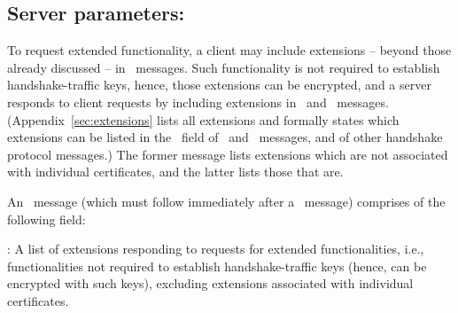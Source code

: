 \subsection{Server parameters: \EncryptedExtensions}\label{sec:EE}


To request extended functionality, a client may include extensions -- beyond those 
already discussed -- in \ClientHello\ messages. Such functionality 
is not required to establish handshake-traffic keys, hence, those extensions 
can be encrypted, and a server responds to client requests by including extensions 
in \EncryptedExtensions\ and \Certificate\ messages.
(Appendix~\ref{sec:extensions} lists all extensions and formally states which extensions 
can be listed in the \TLSextensions\ field of \EncryptedExtensions\ and \Certificate\ 
messages, and of other handshake protocol messages.) The former message lists extensions 
which are not associated with individual certificates, and the latter lists those that are. 

An \EncryptedExtensions\ message (which must follow immediately after a \ServerHello\ 
message) comprises of the following field:

\begin{description}

\item \TLSextensions: A list of extensions responding to requests for extended 
  functionalities, i.e., functionalities not required to establish  handshake-traffic 
  keys (hence, can be encrypted with such keys), excluding extensions 
  associated with individual certificates.

\end{description}

